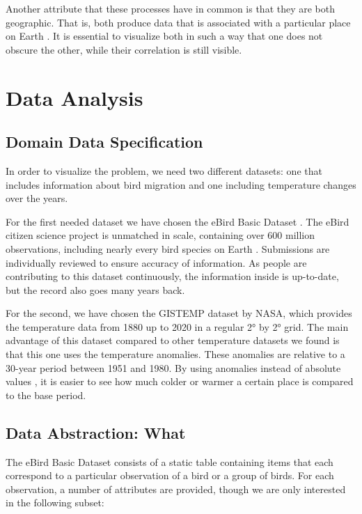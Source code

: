 \documentclass[journal]{vgtc}                %
\begin{document}
Another attribute that these processes have in common is that they are both geographic. That is, both produce data that is associated with a particular place on Earth \cite{iso2014geo}. It is essential to visualize both in such a way that one does not obscure the other, while their correlation is still visible.

\section{Data Analysis}

\subsection{Domain Data Specification}

In order to visualize the problem, we need two different datasets: one that includes information about bird migration and one including temperature changes over the years.

For the first needed dataset we have chosen the eBird Basic Dataset \cite{ebird2020data}. The eBird citizen science project is unmatched in scale, containing over 600 million observations, including nearly every bird species on Earth \cite{strimas2020ebird}. Submissions are individually reviewed to ensure accuracy of information. As people are contributing to this dataset continuously, the information inside is up-to-date, but the record also goes many years back.

For the second, we have chosen the GISTEMP dataset \cite{gistemp} by NASA, which provides the temperature data from 1880 up to 2020 in a regular 2° by 2° grid. The main advantage of this dataset compared to other temperature datasets we found is that this one uses the temperature anomalies. These anomalies are relative to a 30-year period between 1951 and 1980. By using anomalies instead of absolute values \cite{gistempanomalies}, it is easier to see how much colder or warmer a certain place is compared to the base period.

\subsection{Data Abstraction: What}
\label{subsec:data-abs-what}

The eBird Basic Dataset \cite{ebird2020data} consists of a static table containing items that each correspond to a particular observation of a bird or a group of birds. For each observation, a number of attributes are provided, though we are only interested in the following subset:
\end{document}

